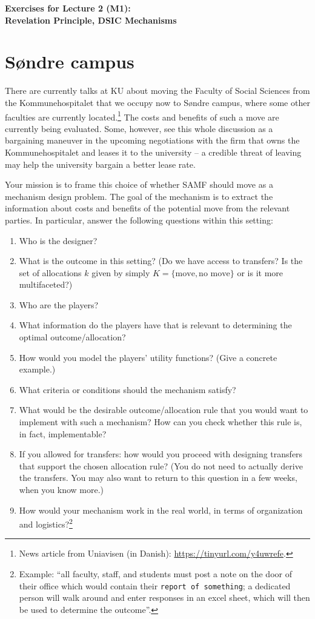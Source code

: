 \documentclass[a4paper]{article}
\begin{document}
\begin{center}
	\LARGE\textbf{Exercises for Lecture 2 (M1):\\ Revelation Principle, DSIC Mechanisms}
\end{center}



\section{S{\o}ndre campus}

There are currently talks at KU about moving the Faculty of Social Sciences from the Kommunehospitalet that we occupy now to S{\o}ndre campus, where some other faculties are currently located.\footnote{News article from Uniavisen (in Danish): \url{https://tinyurl.com/y4uwrefe}.}
The costs and benefits of such a move are currently being evaluated. Some, however, see this whole discussion as a bargaining maneuver in the upcoming negotiations with the firm that owns the Kommunehospitalet and leases it to the university -- a credible threat of leaving may help the university bargain a better lease rate.

Your mission is to frame this choice of whether SAMF should move as a mechanism design problem. The goal of the mechanism is to extract the information about costs and benefits of the potential move from the relevant parties. In particular, answer the following questions within this setting:

\begin{enumerate}
	\item Who is the designer?
	\item What is the outcome in this setting? (Do we have access to transfers? Is the set of allocations $k$ given by simply $K = \{\text{move},\text{no move}\}$ or is it more multifaceted?)
	\item Who are the players?
	\item What information do the players have that is relevant to determining the optimal outcome/allocation?
	\item How would you model the players' utility functions? (Give a concrete example.)
	\item What criteria or conditions should the mechanism satisfy? 
	\item What would be the desirable outcome/allocation rule that you would want to implement with such a mechanism? How can you check whether this rule is, in fact, implementable?
	\item If you allowed for transfers: how would you proceed with designing transfers that support the chosen allocation rule? (You do not need to actually derive the transfers. You may also want to return to this question in a few weeks, when you know more.)
	\item How would your mechanism work in the real world, in terms of organization and logistics?\footnote{Example: ``all faculty, staff, and students must post a note on the door of their office which would contain their \texttt{report of something}; a dedicated person will walk around and enter responses in an excel sheet, which will then be used to determine the outcome''.}
\end{enumerate}
\end{document}
